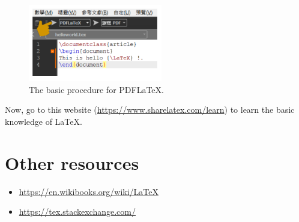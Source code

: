 \begin{figure}[!t]
\centering
\includegraphics[width= 2.3in]{figs//s4}
\caption{The basic procedure for PDFLaTeX.}%
\label{fig.pdflatex}%
\end{figure}



Now, go to this website (\url{https://www.sharelatex.com/learn}) to learn the basic knowledge of {\LaTeX}.

\section{Other resources}

\begin{itemize}
\item \url{https://en.wikibooks.org/wiki/LaTeX}
\item \url{https://tex.stackexchange.com/}
\end{itemize}


